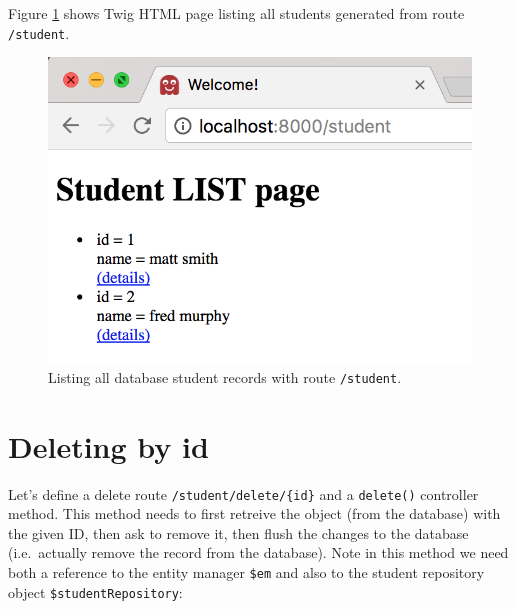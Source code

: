 \documentclass[a4paperpaper,openright]{book}
\begin{document}
Figure \ref{student_list2} shows Twig HTML page listing all students
generated from route \texttt{/student}.

\begin{figure}
\centering
\includegraphics{./tex2pdf.-65f13e14688ab55b/d6c231f28f39e6b1be9d1ad08365c598d6620f5d.png}
\caption{Listing all database student records with route
\texttt{/student}. \label{student_list2}}
\end{figure}

\hypertarget{deleting-by-id}{%
\section{Deleting by id}\label{deleting-by-id}}

Let's define a delete route \texttt{/student/delete/\{id\}} and a
\texttt{delete()} controller method. This method needs to first retreive
the object (from the database) with the given ID, then ask to remove it,
then flush the changes to the database (i.e.~actually remove the record
from the database). Note in this method we need both a reference to the
entity manager \texttt{\$em} and also to the student repository object
\texttt{\$studentRepository}:
\end{document}
